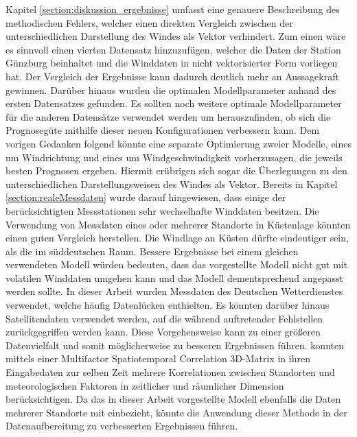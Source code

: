 \documentclass[
12pt, %
toc=listofnumbered, %
toc=chapterentrydotfill, %
numbers=noenddot, %
captions=tableheading, %
bibliography=numbered
]{scrreprt}
\begin{document}
Kapitel \ref{section:diskussion_ergebnisse} umfasst eine genauere Beschreibung des methodischen Fehlers, welcher einen direkten Vergleich zwischen der unterschiedlichen Darstellung des Windes als Vektor verhindert. 
Zum einen wäre es sinnvoll einen vierten Datensatz hinzuzufügen, welcher die Daten der Station Günzburg beinhaltet und die Winddaten in nicht vektorisierter Form vorliegen hat. 
Der Vergleich der Ergebnisse kann dadurch deutlich mehr an Aussagekraft gewinnen. 
Darüber hinaus wurden die optimalen Modellparameter anhand des ersten Datensatzes gefunden. 
Es sollten noch weitere optimale Modellparameter für die anderen Datensätze verwendet werden um herauszufinden, ob sich die Prognosegüte mithilfe dieser neuen Konfigurationen verbessern kann. 
\newline
Dem vorigen Gedanken folgend könnte eine separate Optimierung zweier Modelle, eines um Windrichtung und eines um Windgeschwindigkeit vorherzusagen, die jeweils besten Prognosen ergeben. Hiermit erübrigen sich sogar die Überlegungen zu den unterschiedlichen Darstellungsweisen des Windes als Vektor.  
\newline
Bereits in Kapitel \ref{section:realeMessdaten} wurde darauf hingewiesen, dass einige der berücksichtigten Messstationen sehr wechselhafte Winddaten besitzen. Die Verwendung von Messdaten eines oder mehrerer Standorte in Küstenlage könnten einen guten Vergleich herstellen. 
Die Windlage an Küsten dürfte eindeutiger sein, als die im süddeutschen Raum. Bessere Ergebnisse bei einem gleichen verwendeten Modell würden bedeuten, dass das vorgestellte Modell nicht gut mit volatilen Winddaten umgehen kann und das Modell dementsprechend angepasst werden sollte.
\newline
In dieser Arbeit wurden Messdaten des Deutschen Wetterdienstes verwendet, welche häufig Datenlücken enthielten. Es könnten darüber hinaus Satellitendaten verwendet werden, auf die während auftretender Fehlstellen zurückgegriffen werden kann. 
Diese Vorgehensweise kann zu einer größeren Datenvielfalt und somit möglicherweise zu besseren Ergebnissen führen.
\newline
\citeauthor{2019_Chen_MultifactorSpatiotemporalCorrelation} \cite{2019_Chen_MultifactorSpatiotemporalCorrelation} konnten mittels einer Multifactor Spatiotemporal Correlation 3D-Matrix in ihren Eingabedaten zur selben Zeit mehrere Korrelationen zwischen Standorten und meteorologischen Faktoren in zeitlicher und räumlicher Dimension berücksichtigen. 
Da das in dieser Arbeit vorgestellte Modell ebenfalls die Daten mehrerer Standorte mit einbezieht, könnte die Anwendung dieser Methode in der Datenaufbereitung zu verbesserten Ergebnissen führen. 
\end{document}
